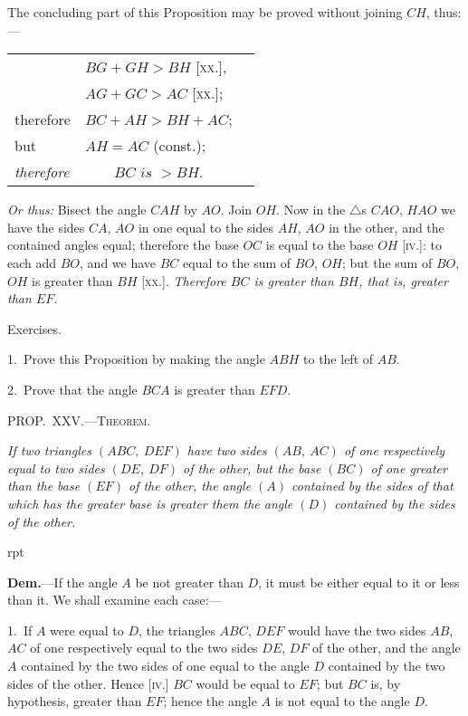 \documentclass[oneside]{book}
\newcommand\mypropl[2]{
\bigskip\Needspace*{4\baselineskip}\begin{center}\textsc{#1}\end{center}
\hspace{\parindent}\emph{#2}\par\medskip
}
\newcommand\exhead[1]{
\Needspace*{5\baselineskip}\begin{center}
\textsf{#1}
\end{center}
}
\newcommand\imgflow[3]{
\setcounter{wrapwidth}{#1}
\begin{wrapfigure}[#2]{r}{\value{wrapwidth}pt}
\begin{center}
\vspace{-0.3in}
\end{center}
\end{wrapfigure}
}
\begin{document}
\begin{footnotesize}
The concluding part of this Proposition may be proved without
joining $CH$, thus:---
\\
\begin{tabular*}{\textwidth}{@{} l@{\extracolsep\fill} l r}
& $BG + GH > BH$ [\textsc{xx.}], &\phantom{therefore}  \\[.5ex]
& $AG + GC > AC$ [\textsc{xx.}]; \\[.5ex]
therefore & $BC + AH > BH + AC$; \\[.5ex]
but & $AH = AC$ (const.); \\[.5ex]
\textit{therefore} & \multicolumn{1}{c}{$BC \textit{ is } > BH$.}
\end{tabular*}\par\medskip

\textit{Or thus:} Bisect the angle $CAH$ by $AO$. Join $OH$. Now in
the $\triangle$s $CAO$, $HAO$ we have the sides $CA$, $AO$ in one equal to
the sides $AH$, $AO$ in the other, and the contained angles equal;
therefore the base $OC$ is equal to the base $OH$ [\textsc{iv.}]: to each add
$BO$, and we have $BC$ equal to the sum of $BO$, $OH$; but the sum
of $BO$, $OH$ is greater than $BH$ [\textsc{xx.}]. \textit{Therefore $BC$ is greater
than $BH$, that is, greater than $EF$.}
\par\end{footnotesize}

\exhead{Exercises.}

\begin{footnotesize}
1.~Prove this Proposition by making the angle $ABH$ to the
left of $AB$.

2.~Prove that the angle $BCA$ is greater than $EFD$.
\par\end{footnotesize}


\mypropl{PROP\@.~XXV\@.---Theorem.}{If two triangles $(ABC,\ DEF)$ have two sides $(AB,\ AC)$
of one respectively equal to two sides $(DE,\ DF)$ of the
other, but the base $(BC)$ of one greater than the base
$(EF)$ of the other, the angle $(A)$ contained by the sides of
that which has the greater base is greater them the angle
$(D)$ contained by the sides of the other.}

\imgflow{190}{10}{f042}

\textbf{Dem.}---If the angle $A$ be not greater than $D$, it must
be either equal to
it or less than it.
We shall examine
each case:---

1.~If $A$ were
equal to $D$, the triangles
$ABC$, $DEF$
would have the two
sides $AB$, $AC$ of one
respectively equal
to the two sides $DE$, $DF$ of the other, and the angle $A$
contained by the two sides of one equal to the angle $D$
contained by the two sides of the other. Hence [\textsc{iv}.]
$BC$ would be equal to $EF$; but $BC$ is, by hypothesis,
greater than $EF$; hence the angle $A$ is not equal to
the angle $D$.
\end{document}
